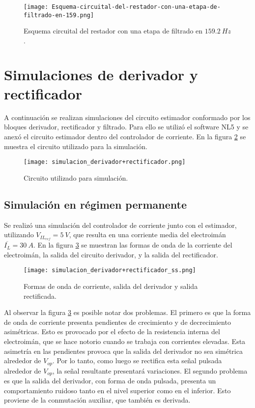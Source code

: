 \begin{figure}[H]
	\centering
	\texttt{[image: Esquema-circuital-del-restador-con-una-etapa-de-filtrado-en-159.png]}
	\caption{Esquema circuital del restador con una etapa de filtrado en $159.2\: Hz$.}
	\label{fig:img_Esquema-circuital-del-restador-con-una-etapa-de-filtrado-en-159}
\end{figure}


\section{Simulaciones de derivador y rectificador}

A continuación se realizan simulaciones del circuito estimador conformado por los bloques derivador, rectificador y filtrado. Para ello se utilizó el software NL5 y se anexó el circuito estimador dentro del controlador de corriente. En la figura \ref{fig:img_simulacion_derivador+rectificador} se muestra el circuito utilizado para la simulación.

\begin{figure}[H]
	\centering
	\texttt{[image: simulacion\_derivador+rectificador.png]}
	\caption{Circuito utilizado para simulación.}
	\label{fig:img_simulacion_derivador+rectificador}
\end{figure}

\subsection{Simulación en régimen permanente} \label{sec_simulacion_estimador_basico}

Se realizó una simulación del controlador de corriente junto con el estimador, utilizando $V_{IL_{ref}}=5\:V$, que resulta en una corriente media del electroimán $\overline{I_L}=30\:A$. En la figura \ref{fig:img_simulacion_derivador+rectificador_ss} se muestran las formas de onda de la corriente del electroimán, la salida del circuito derivador, y la salida del rectificador. 

\begin{figure}[H]
	\centering
	\texttt{[image: simulacion\_derivador+rectificador\_ss.png]}
	\caption{Formas de onda de corriente, salida del derivador y salida rectificada.}
	\label{fig:img_simulacion_derivador+rectificador_ss}
\end{figure}

Al observar la figura \ref{fig:img_simulacion_derivador+rectificador_ss} es posible notar dos problemas. El primero es que la forma de onda de corriente presenta pendientes de crecimiento y de decrecimiento asimétricas. Esto es provocado por el efecto de la resistencia interna del electroimán, que se hace notorio cuando se trabaja con corrientes elevadas. Esta asimetría en las pendientes provoca que la salida del derivador no sea simétrica alrededor de $V_{op}$. Por lo tanto, como luego se rectifica esta señal pulsada alrededor de $V_{op}$, la señal resultante presentará variaciones. El segundo problema es que la salida del derivador, con forma de onda pulsada, presenta un comportamiento ruidoso tanto en el nivel superior como en el inferior. Esto proviene de la conmutación auxiliar, que también es derivada. 

